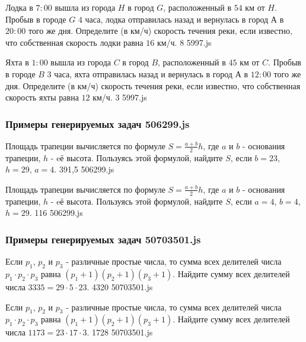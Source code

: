 \par{Лодка в $7:00$ вышла из города $H$ в город $G$, расположенный в $54$ км от $H$. Пробыв в городе $G$ $4$ часа, лодка отправилась назад и вернулась в город $А$ в $20:00$ того же дня. Определите (в км/ч) скорость течения реки, если известно, что собственная скорость лодки равна $16$ км/ч. }{ 8 }{5997.js}
\par{Яхта в $1:00$ вышла из города $C$ в город $B$, расположенный в $45$ км от $C$. Пробыв в городе $B$ $3$ часа, яхта отправилась назад и вернулась в город $А$ в $12:00$ того же дня. Определите (в км/ч) скорость течения реки, если известно, что собственная скорость яхты равна $12$ км/ч. }{ 3 }{5997.js}


\subsubsection*{Примеры генерируемых задач 506299.js}   

\par{Площадь трапеции вычисляется по формуле $S=\frac{a+b}{2}h$, где $a$ и $b$ - основания трапеции, $h$ - eё высота. Пользуясь этой формулой, найдите $S$, если $b=23$, $h=29$, $a=4$. }{ 391,5 }{506299.js}
\par{Площадь трапеции вычисляется по формуле $S=\frac{a+b}{2}h$, где $a$ и $b$ - основания трапеции, $h$ - eё высота. Пользуясь этой формулой, найдите $S$, если $a=4$, $b=4$, $h=29$. }{ 116 }{506299.js}


\subsubsection*{Примеры генерируемых задач 50703501.js}   

\par{Если $p_1$, $p_2$ и $p_3$ - различные простые числа, то сумма всех делителей числа $p_1\cdot p_2\cdot p_3$ равна $(p_1+1)(p_2+1)(p_3+1)$. Найдите сумму всех делителей числа $3335=29\cdot5\cdot23$. }{ 4320 }{50703501.js}
\par{Если $p_1$, $p_2$ и $p_3$ - различные простые числа, то сумма всех делителей числа $p_1\cdot p_2\cdot p_3$ равна $(p_1+1)(p_2+1)(p_3+1)$. Найдите сумму всех делителей числа $1173=23\cdot17\cdot3$. }{ 1728 }{50703501.js}


